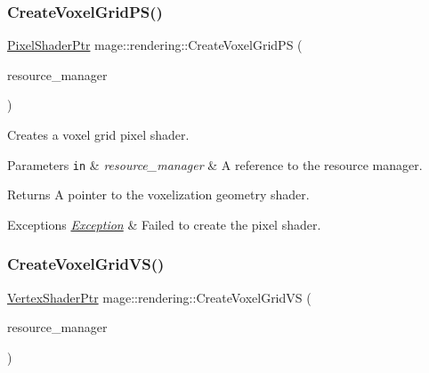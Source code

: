 \subsubsection{\texorpdfstring{Create\+Voxel\+Grid\+P\+S()}{CreateVoxelGridPS()}}
{\footnotesize\ttfamily \mbox{\hyperlink{namespacemage_1_1rendering_af03d922b228ee9c8542baaa2ecc9f259}{Pixel\+Shader\+Ptr}} mage\+::rendering\+::\+Create\+Voxel\+Grid\+PS (\begin{DoxyParamCaption}\item[{\mbox{\hyperlink{classmage_1_1rendering_1_1_resource_manager}{Resource\+Manager}} \&}]{resource\+\_\+manager }\end{DoxyParamCaption})}

Creates a voxel grid pixel shader.


\begin{DoxyParams}[1]{Parameters}
\mbox{\tt in}  & {\em resource\+\_\+manager} & A reference to the resource manager. \\
\hline
\end{DoxyParams}
\begin{DoxyReturn}{Returns}
A pointer to the voxelization geometry shader. 
\end{DoxyReturn}

\begin{DoxyExceptions}{Exceptions}
{\em \mbox{\hyperlink{classmage_1_1_exception}{Exception}}} & Failed to create the pixel shader. \\
\hline
\end{DoxyExceptions}
\mbox{\label{namespacemage_1_1rendering_ac3e99cb1d1c322bfc84a95932533af94}} 
\subsubsection{\texorpdfstring{Create\+Voxel\+Grid\+V\+S()}{CreateVoxelGridVS()}}
{\footnotesize\ttfamily \mbox{\hyperlink{namespacemage_1_1rendering_aaf704b9c54a4181f4950a1761de69dda}{Vertex\+Shader\+Ptr}} mage\+::rendering\+::\+Create\+Voxel\+Grid\+VS (\begin{DoxyParamCaption}\item[{\mbox{\hyperlink{classmage_1_1rendering_1_1_resource_manager}{Resource\+Manager}} \&}]{resource\+\_\+manager }\end{DoxyParamCaption})}

